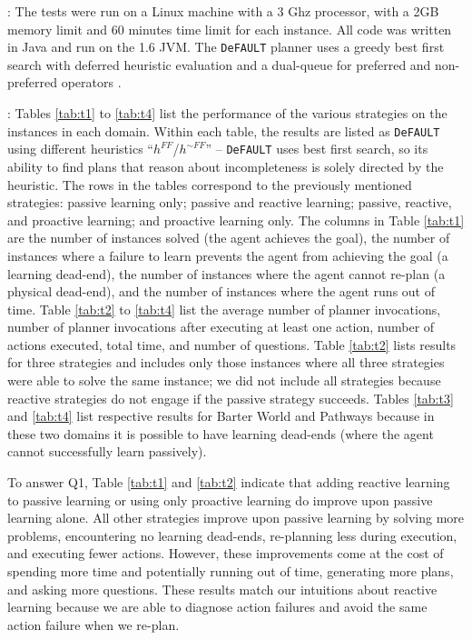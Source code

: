 \documentclass[letterpaper]{article}
\def\und#1{\noindent{\bf #1}:}
\def\citep#1{\cite{#1}}
\def\FFRISKY{{\tt DeFAULT}}
\begin{document}
\und{Test Setup} The tests were run on a Linux machine with a 3 Ghz processor,
with a  2GB memory limit and 60 minutes time limit for each instance. All code
was written in Java and run on the 1.6 JVM. The \FFRISKY{} planner uses a greedy
best first search with deferred heuristic evaluation and a dual-queue for
preferred and non-preferred operators \citep{DBLP:journals/jair/Helmert06}. 

\und{Results} Tables \ref{tab:t1} to \ref{tab:t4} list the performance of the
various strategies on the instances in each domain.  Within each table, the
results are listed as \FFRISKY{} using different heuristics
``$h^{FF}$/$h^{\sim FF}$'' -- \FFRISKY{} uses best first search, so its
ability to find plans that reason about incompleteness is solely directed by the
heuristic. The rows in the tables correspond to the previously mentioned
strategies: passive learning only; passive and reactive learning;  passive, reactive, and proactive learning; and proactive learning only.  The columns in Table
\ref{tab:t1} are the number of instances solved (the agent achieves the goal),
the number of instances where a failure to learn prevents the agent from
achieving the goal (a learning dead-end), the number of instances where the
agent cannot re-plan (a physical dead-end), and the number of instances where
the agent runs out of time.  Table \ref{tab:t2} to \ref{tab:t4} list the average
number of planner invocations, number of planner invocations after executing at
least one action, number of actions executed, total time, and number of
questions.  Table \ref{tab:t2} lists results for three strategies and includes
only those instances where all three strategies were able to solve the same
instance; we did not include all strategies because reactive strategies do not
engage if the passive strategy succeeds. Tables \ref{tab:t3} and \ref{tab:t4}
list respective results for Barter World and Pathways because in these two domains it is possible to have learning dead-ends (where the agent cannot successfully learn passively).



To answer Q1, Table \ref{tab:t1} and \ref{tab:t2} indicate that adding reactive
learning to passive learning or using only proactive learning do improve upon
passive learning alone.  All other strategies improve upon passive learning by
solving more problems, encountering no learning dead-ends, re-planning less during
execution, and executing fewer actions.  However, these improvements come at the
cost of spending more time and potentially running out of time, generating more
plans, and asking more questions.  These results match our intuitions about
reactive learning because we are able to diagnose action failures and avoid the
same action failure when we re-plan.
\end{document}
